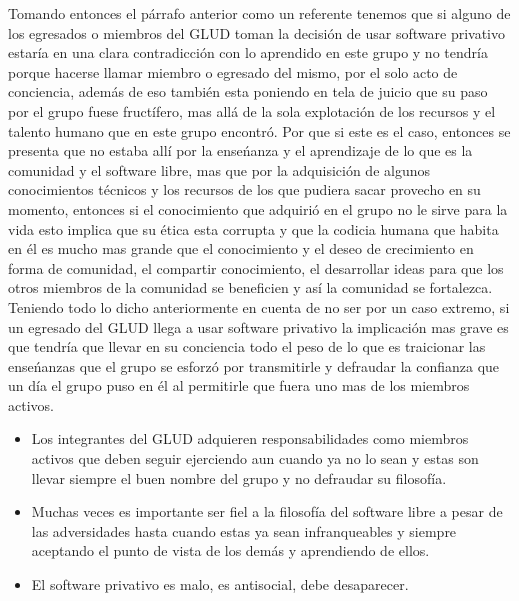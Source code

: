 \begin{multicols}{2}
Tomando entonces el párrafo anterior como un referente tenemos que si alguno de los egresados o miembros del GLUD toman la decisión de usar software 
privativo estaría en una clara contradicción con lo aprendido en este grupo y no tendría porque hacerse llamar miembro o egresado del mismo, por 
el solo acto de conciencia, además de eso también esta poniendo en tela de juicio que su paso por el grupo fuese fructífero, mas allá de la sola 
explotación de los recursos y el talento humano que en este grupo encontró. Por que si este es el caso, entonces se presenta que no estaba allí 
por la enseńanza y el aprendizaje de lo que es la comunidad y el software libre, mas que por la adquisición de algunos conocimientos técnicos 
y los recursos de los que pudiera sacar provecho en su momento, entonces si el conocimiento que adquirió en el grupo no le sirve para la vida esto 
implica que su ética esta corrupta y que la codicia humana que habita en él es mucho mas grande que el conocimiento y el deseo de crecimiento 
en forma de comunidad, el compartir conocimiento, el desarrollar ideas para que los otros miembros de la comunidad se beneficien y así la comunidad 
se fortalezca.\\

Teniendo todo lo dicho anteriormente en cuenta de no ser por un caso extremo, si un egresado del GLUD llega a usar software privativo la implicación 
mas grave es que tendría que llevar en su conciencia todo el peso de lo que es traicionar las enseńanzas que el grupo se esforzó por transmitirle y 
defraudar la confianza que un día el grupo puso en él al permitirle que fuera uno mas de los miembros activos.

\begin{itemize}
 \item Los integrantes del GLUD adquieren responsabilidades como miembros activos que deben seguir ejerciendo aun cuando ya no lo sean y estas son 
 llevar siempre el buen nombre del grupo y no defraudar su filosofía.
 \item Muchas veces es importante ser fiel a la filosofía del software libre a pesar de las adversidades hasta cuando estas ya sean infranqueables y 
 siempre aceptando el punto de vista de los demás y aprendiendo de ellos.
 \item El software privativo es malo, es antisocial, debe desaparecer.
\end{itemize}






\end{multicols}
